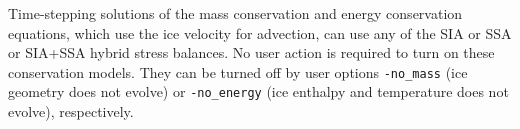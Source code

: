 Time-stepping solutions of the mass conservation and energy conservation equations, which use the ice velocity for advection, can use any of the SIA or SSA or SIA+SSA hybrid stress balances.  No user action is required to turn on these conservation models.  They can be turned off by user options \texttt{-no_mass} (ice geometry does not evolve) or \texttt{-no_energy} (ice enthalpy and temperature does not evolve), respectively.

\newenvironment{tightlist}{\begin{itemize}  \vspace{-0.15in}\addtolength{\itemsep}{-0.5\baselineskip} } {\vspace{-0.1in} \end{itemize}}

\newcommand{\nolist}[1]{[\emph{#1}] \vspace{0.1in}}

